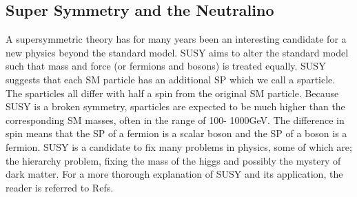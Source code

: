 \subsection{Super Symmetry and the Neutralino}
A supersymmetric theory has for many years been an interesting candidate for a new physics beyond the standard 
model. \ac{SUSY} aims to alter the standard model such that mass and force (or fermions and bosons) is treated equally. 
\ac{SUSY} suggests that each \ac{SM} particle has an additional \ac{SP} which we call a sparticle. 
The sparticles all differ with half a spin from the original \ac{SM} particle. Because \ac{SUSY} is a broken symmetry, 
sparticles are expected to be much higher than the corresponding \ac{SM} masses, often in the range of 100- 1000GeV. 
The difference in spin means that the \ac{SP} of a fermion is a scalar boson and the \ac{SP} of a boson is a fermion. \ac{SUSY} is a 
candidate to fix many problems in physics, some of which are; the hierarchy problem, fixing the mass of the higgs 
and possibly the mystery of dark matter. For a more thorough explanation of \ac{SUSY} and its application, the 
reader is referred to Refs.\cite{SUSY}

